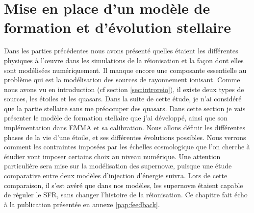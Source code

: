 \chapter{Mise en place d'un modèle de formation et d'évolution stellaire}
\label{sec:etoiles}

Dans les parties précédentes nous avons présenté quelles étaient les différentes physiques à l’œuvre dans les simulations de la réionisation et la façon dont elles sont modélisées numériquement.
Il manque encore une composante essentielle au problème qui est la modélisation des sources de rayonnement ionisant.
Comme nous avons vu en introduction (cf section \ref{sec:introreio}), il existe deux types de sources, les étoiles et les quasars.
Dans la suite de cette étude, je n'ai considéré que la partie stellaire sans me préoccuper des quasars.
Dans cette section je vais présenter le modèle de formation stellaire que j'ai développé, ainsi que son implémentation dans EMMA et sa calibration.
Nous allons définir les différentes phases de la vie d'une étoile, et ses différentes évolutions possibles.
Nous verrons comment les contraintes imposées par les échelles cosmologique que l'on cherche à étudier vont imposer certains choix au niveau numérique.
Une attention particulière sera mise sur la modélisation des supernovæ, puisque une étude comparative entre deux modèles d'injection d'énergie suivra.
Lors de cette comparaison, il s'est avéré que dans nos modèles, les supernovæ étaient capable de réguler le \ac{SFR}, sans changer l'histoire de la réionisation.
Ce chapitre fait écho à la publication présentée en annexe \ref{pap:feedback}.
%


